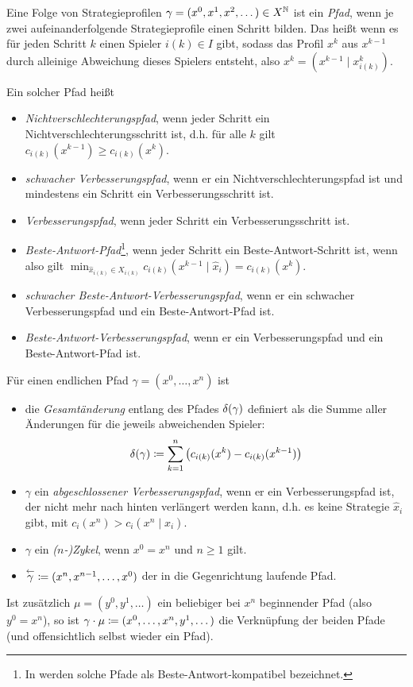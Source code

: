 \begin{defn}\label{defn:Pfade}
	Eine Folge von Strategieprofilen $\gamma = (x^0, x^1, x^2, \dots) \in X^{\mathbb{N}}$ ist ein \emph{Pfad}, wenn je zwei aufeinanderfolgende Strategieprofile einen Schritt bilden. Das heißt wenn es für jeden Schritt $k$ einen Spieler $i(k) \in I$ gibt, sodass das Profil $x^{k}$ aus $x^{k-1}$ durch alleinige Abweichung dieses Spielers entsteht, also $x^{k} = \left(x^{k-1} \mid x^{k}_{i(k)}\right)$.
	
	Ein solcher Pfad heißt
	\begin{itemize}
		\item \emph{Nichtverschlechterungspfad}, wenn jeder Schritt ein Nichtverschlechterungsschritt ist, d.h. für alle $k$ gilt $c_{i(k)}(x^{k-1}) \geq c_{i(k)}(x^{k})$.
		\item \emph{schwacher Verbesserungspfad}, wenn er ein Nichtverschlechterungspfad ist und mindestens ein Schritt ein Verbesserungsschritt ist.
		\item \emph{Verbesserungspfad}, wenn jeder Schritt ein Verbesserungsschritt ist.
		\item \emph{Beste-Antwort-Pfad}\footnote{In \cite{BestRespPot} werden solche Pfade als \glqq Beste-Antwort-kompatibel\grqq{} bezeichnet.}, wenn jeder Schritt ein Beste-Antwort-Schritt ist, wenn also gilt $\min_{\hat{x}_{i(k)} \in X_{i(k)}} c_{i(k)}(x^{k-1} \mid \hat{x}_i) = c_{i(k)}(x^k)$.
		\item \emph{schwacher Beste-Antwort-Verbesserungspfad}, wenn er ein schwacher Verbesserungspfad und ein Beste-Antwort-Pfad ist.
		\item \emph{Beste-Antwort-Verbesserungspfad}, wenn er ein Verbesserungspfad und ein Beste-Antwort-Pfad ist.
	\end{itemize}
\end{defn}

\begin{defn}\label{defn:Pfade2}	
	Für einen endlichen Pfad $\gamma = (x^0, \dots, x^n)$ ist
	\begin{itemize}
		\item die \emph{Gesamtänderung} entlang des Pfades $\delta(\gamma)$ definiert als die Summe aller Änderungen für die jeweils abweichenden Spieler:
		\[\delta(\gamma) \coloneqq \sum_{k=1}^{n} \left(c_{i(k)}(x^k) - c_{i(k)}(x^{k-1})\right) \]
		\item $\gamma$ ein \emph{abgeschlossener Verbesserungspfad}, wenn er ein Verbesserungspfad ist, der nicht mehr nach hinten verlängert werden kann, d.h. es keine Strategie $\hat{x}_i$ gibt, mit $c_{i}(x^n) > c_{i}(x^n \mid \hat{x}_i)$.
		\item $\gamma$ ein \emph{($n$-)Zykel}, wenn $x^0 = x^n$ und $n \geq 1$ gilt.
		\item $\overset{\leftarrow}{\gamma} \coloneqq (x^n, x^{n-1}, \dots, x^0)$ der in die Gegenrichtung laufende Pfad.
	\end{itemize}

	Ist zusätzlich $\mu = (y^0, y^1, \dots)$ ein beliebiger bei $x^n$ beginnender Pfad (also $y^0 = x^n$), so ist $\gamma\cdot\mu \coloneqq (x^0, \dots, x^n, y^1, \dots)$ die Verknüpfung der beiden Pfade (und offensichtlich selbst wieder ein Pfad).
\end{defn}

